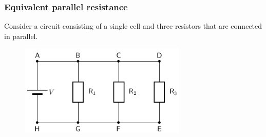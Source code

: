             \subsubsection{ Equivalent parallel resistance}
            \nopagebreak
            \label{m38776*id65406}Consider a circuit consisting of a single cell and three resistors that are connected in parallel.\par 
          \label{m38776*id65410}
            
    \setcounter{subfigure}{0}


	\begin{figure}[H] %
    \begin{center}
    \label{m38776*id65414!!!underscore!!!media}\label{m38776*id65414!!!underscore!!!printimage}\includegraphics[width=300px]{col11305.imgs/m38776_PG11C9_009.png} %
        
      \vspace{2pt}
    \vspace{.1in}
    
    \end{center}

 \end{figure}   

    \addtocounter{footnote}{-0}
    
          \par 
          
          
          
          
          
          
          
